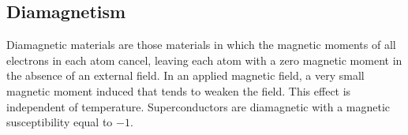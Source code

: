 \documentclass[../main.tex]{subfiles}
\begin{document}
\subsection{Diamagnetism}
\label{sub:diamagnetism}

Diamagnetic materials are those materials in which the magnetic moments of all
electrons in each atom cancel, leaving each atom with a zero magnetic moment in
the absence of an external field. In an applied magnetic field, a very small
magnetic moment induced that tends to weaken the field. This effect is
independent of temperature. Superconductors are diamagnetic with a magnetic
susceptibility equal to $-1$.
\end{document}

